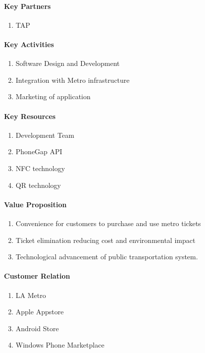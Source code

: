 		\paragraph{Key Partners}\begin{enumerate}
			\item TAP
		\end{enumerate}
		
		\paragraph{Key Activities}\begin{enumerate}
			\item Software Design and Development
			\item Integration with Metro  infrastructure
			\item Marketing of application
		\end{enumerate}
		
		\paragraph{Key Resources}\begin{enumerate}
			\item Development Team
			\item PhoneGap API
			\item NFC technology
			\item QR technology
		\end{enumerate}
		
		\paragraph{Value Proposition}\begin{enumerate}
			\item Convenience for customers to purchase and use metro tickets
			\item Ticket elimination reducing cost and environmental impact
			\item Technological advancement of public transportation system. 
 		\end{enumerate}
 		
 		\paragraph{Customer Relation}\begin{enumerate}
 			\item LA Metro
 			\item Apple Appstore
 			\item Android Store
 			\item Windows Phone Marketplace
 		\end{enumerate}

